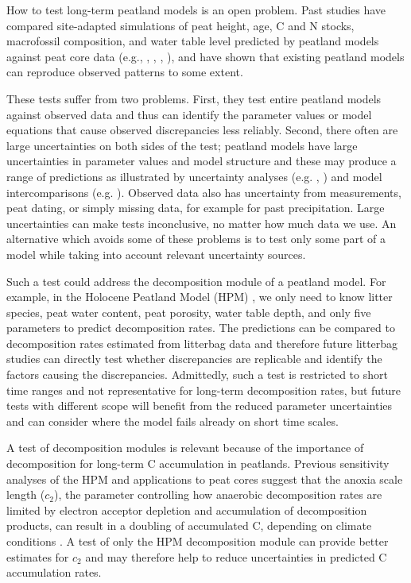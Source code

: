 \documentclass[esd, manuscript]{copernicus}
\begin{document}
How to test long-term peatland models is an open problem. Past studies have compared site-adapted simulations of peat height, age, C and N stocks, macrofossil composition, and water table level predicted by peatland models against peat core data (e.g., \citet{Frolking.2010}, \citet{Tuittila.2013}, \citet{Treat.2021}, \citet{Zhao.2022}), and have shown that existing peatland models can reproduce observed patterns to some extent.

These tests suffer from two problems. First, they test entire peatland models against observed data and thus can identify the parameter values or model equations that cause observed discrepancies less reliably. Second, there often are large uncertainties on both sides of the test; peatland models have large uncertainties in parameter values and model structure and these may produce a range of predictions as illustrated by uncertainty analyses (e.g. \citet{Quillet.2013}, \citet{Quillet.2013a}) and model intercomparisons (e.g. \citet{Zhao.2022}). Observed data also has uncertainty from measurements, peat dating, or simply missing data, for example for past precipitation. Large uncertainties can make tests inconclusive, no matter how much data we use. An alternative which avoids some of these problems is to test only some part of a model while taking into account relevant uncertainty sources.

Such a test could address the decomposition module of a peatland model. For example, in the Holocene Peatland Model (HPM) \citep{Frolking.2010}, we only need to know litter species, peat water content, peat porosity, water table depth, and only five parameters to predict decomposition rates. The predictions can be compared to decomposition rates estimated from litterbag data and therefore future litterbag studies can directly test whether discrepancies are replicable and identify the factors causing the discrepancies. Admittedly, such a test is restricted to short time ranges and not representative for long-term decomposition rates, but future tests with different scope will benefit from the reduced parameter uncertainties and can consider where the model fails already on short time scales.

A test of decomposition modules is relevant because of the importance of decomposition for long-term C accumulation in peatlands. Previous sensitivity analyses of the HPM and applications to peat cores suggest that the anoxia scale length (\(c_2\)), the parameter controlling how anaerobic decomposition rates are limited by electron acceptor depletion and accumulation of decomposition products, can result in a doubling of accumulated C, depending on climate conditions \citep{Quillet.2013a, Kurnianto.2015}. A test of only the HPM decomposition module can provide better estimates for \(c_2\) and may therefore help to reduce uncertainties in predicted C accumulation rates.
\end{document}
